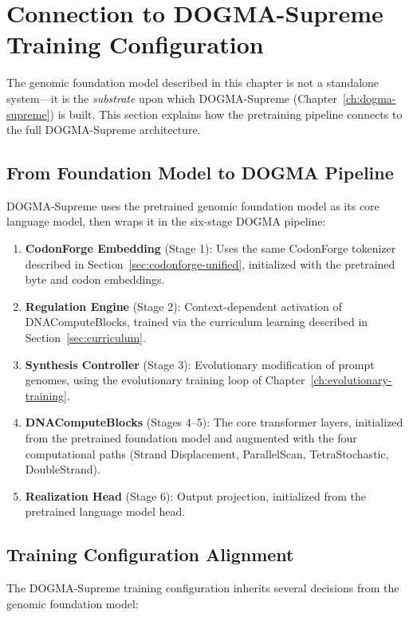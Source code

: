 \section{Connection to DOGMA-Supreme Training Configuration}
\label{sec:supreme-connection}

The genomic foundation model described in this chapter is not a standalone system---it is the \emph{substrate} upon which DOGMA-Supreme (Chapter~\ref{ch:dogma-supreme}) is built. This section explains how the pretraining pipeline connects to the full DOGMA-Supreme architecture.

\subsection{From Foundation Model to DOGMA Pipeline}

DOGMA-Supreme uses the pretrained genomic foundation model as its core language model, then wraps it in the six-stage DOGMA pipeline:

\begin{enumerate}[leftmargin=1.5em]
  \item \textbf{CodonForge Embedding} (Stage 1): Uses the same CodonForge tokenizer described in Section~\ref{sec:codonforge-unified}, initialized with the pretrained byte and codon embeddings.
  \item \textbf{Regulation Engine} (Stage 2): Context-dependent activation of DNAComputeBlocks, trained via the curriculum learning described in Section~\ref{sec:curriculum}.
  \item \textbf{Synthesis Controller} (Stage 3): Evolutionary modification of prompt genomes, using the evolutionary training loop of Chapter~\ref{ch:evolutionary-training}.
  \item \textbf{DNAComputeBlocks} (Stages 4--5): The core transformer layers, initialized from the pretrained foundation model and augmented with the four computational paths (Strand Displacement, ParallelScan, TetraStochastic, DoubleStrand).
  \item \textbf{Realization Head} (Stage 6): Output projection, initialized from the pretrained language model head.
\end{enumerate}

\subsection{Training Configuration Alignment}

The DOGMA-Supreme training configuration inherits several decisions from the genomic foundation model:


